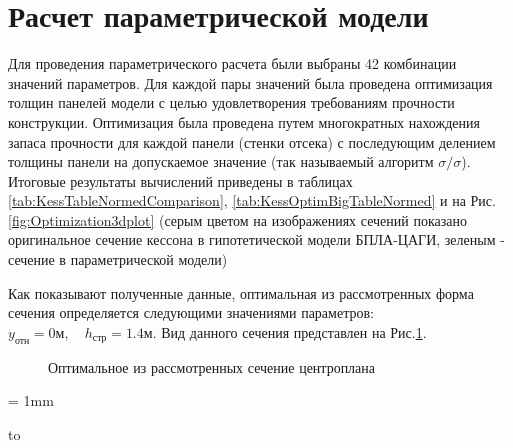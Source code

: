 \section{Расчет параметрической модели}
\label{sec:calculationOfModel}
Для проведения параметрического расчета были выбраны 42 комбинации значений параметров. Для каждой пары значений была проведена оптимизация толщин панелей модели с целью удовлетворения требованиям прочности конструкции. Оптимизация была проведена путем многократных нахождения запаса прочности для каждой панели (стенки отсека) с последующим делением толщины панели на допускаемое значение (так называемый алгоритм $\sigma/\sigma$). Итоговые результаты вычислений приведены в таблицах \ref{tab:KessTableNormedComparison}, \ref{tab:KessOptimBigTableNormed} и на Рис.\ref{fig:Optimization3dplot} (серым цветом на изображениях сечений показано оригинальное сечение кессона в гипотетической модели БПЛА-ЦАГИ, зеленым - сечение в параметрической модели)  


Как показывают полученные данные, оптимальная из рассмотренных форма сечения определяется следующими значениями параметров: $y_\text{отн} = 0\text{м},\quad h_\text{стр}=1.4\text{м}$. Вид данного сечения представлен на Рис.\ref{fig:optimalSection}.

\begin{figure}
\centering
\def\svgwidth{0.9\textwidth}

\caption{Оптимальное из рассмотренных сечение центроплана}
\label{fig:optimalSection}
\end{figure}



\tabulinesep = 1mm
\begin{table}[ht]
    \fontsize{11pt}{12pt}\selectfont
\captionsetup{justification=centering}
\caption{Зависимость веса кессона от параметров центроплана относительно варианта с прямым кессоном}
\begin{tabu}to 
\hline

\end{tabu}

\label{tab:KessTableNormedComparison}
\end{table}

